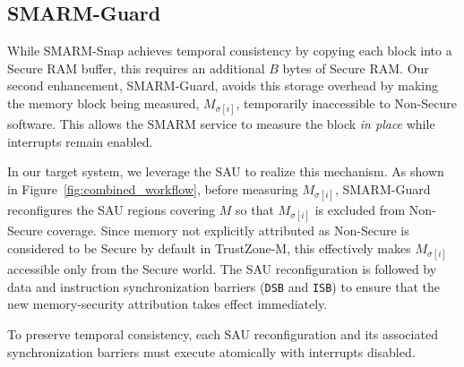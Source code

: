 \documentclass[conference]{IEEEtran}
\newcommand{\smarmcopy}{SMARM-Snap\xspace}
\newcommand{\smarmlock}{SMARM-Guard\xspace}
\begin{document}
\subsection{\smarmlock}
\label{sec:sau}

While \smarmcopy achieves temporal consistency by copying each block into a Secure RAM buffer, this requires an additional $B$ bytes of Secure RAM. Our second enhancement, \smarmlock, avoids this storage overhead by making the memory block being measured, $M_{\sigma[i]}$, temporarily inaccessible to Non-Secure software.
This allows the SMARM service to measure the block \emph{in place} while interrupts remain enabled.

In our target system, we leverage the SAU to realize this mechanism. As shown in Figure~\ref{fig:combined_workflow}, before measuring $M_{\sigma[i]}$, \smarmlock reconfigures the SAU regions covering $M$ so that $M_{\sigma[i]}$ is excluded from Non-Secure coverage.
Since memory not explicitly attributed as Non-Secure is considered to be Secure by default in TrustZone-M, this effectively makes $M_{\sigma[i]}$ accessible only from the Secure world. 
The SAU reconfiguration is followed by data and instruction synchronization barriers (\texttt{DSB} and \texttt{ISB}) to ensure that the new memory-security attribution takes effect immediately.


To preserve temporal consistency, each SAU reconfiguration and its
associated synchronization barriers must execute atomically with
interrupts disabled.
\end{document}
